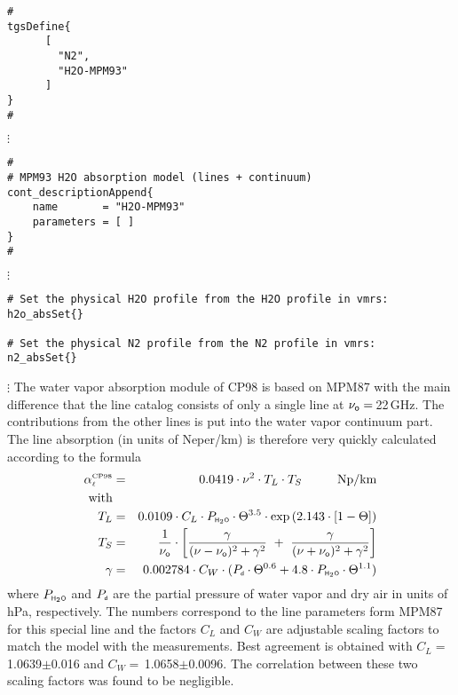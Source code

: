 {

\begin{verbatim}
#
tgsDefine{
      [ 
        "N2",
        "H2O-MPM93"
      ] 
}
#
\end{verbatim}
$\vdots$
\begin{verbatim}
#
# MPM93 H2O absorption model (lines + continuum)
cont_descriptionAppend{
    name       = "H2O-MPM93"
    parameters = [ ]
}
#
\end{verbatim}
$\vdots$
\begin{verbatim}
# Set the physical H2O profile from the H2O profile in vmrs:
h2o_absSet{}

# Set the physical N2 profile from the N2 profile in vmrs:
n2_absSet{}
\end{verbatim}
$\vdots$
%
%
%
% 
\label{leveld:cp98}
%
\label{levele:cp98_line}
The water vapor absorption module of CP98 \cite{cruzpol:98} is based on 
MPM87 with the main difference that the line catalog consists of only a 
single line at $\nu_{\sf o}=$\,22\,GHz. 
The contributions from the other lines is put into the water vapor 
continuum part. The line absorption (in units of Neper/km) is therefore 
very quickly calculated according to the formula
\begin{eqnarray}
  \label{eq:cp98:lineabs}
  \alphacpl &=& 0.0419 \cdot \nu^2 \cdot T_L \cdot T_S\hspace*{10mm}\mbox{Np/km}\\
  \mbox{with} & & \nonumber\\
  T_L       &=& 0.0109 \cdot C_L \cdot \phzo \cdot \Theta^{3.5} 
                \cdot \exp{(2.143\cdot[1-\Theta])}\nonumber\\
  T_S       &=& \frac{1}{\nu_{\sf o}} \cdot 
                \left[\frac{\gamma}{(\nu-\nu_{\sf o})^2+\gamma^2}~+~
                \frac{\gamma}{(\nu+\nu_{\sf o})^2+\gamma^2}\right]\nonumber\\
  \gamma    &=& 0.002784 \cdot C_W \cdot (\pda \cdot \Theta^{0.6}+ 
                4.8 \cdot \phzo \cdot \Theta^{1.1}) \nonumber\\
\end{eqnarray}
where $P_{\mbox{\tiny \sf H}_{2}\mbox{\tiny \sf O}}$ and $P_{\mbox{\tiny \sf d}}$ are the partial pressure of water vapor and dry
air in units of hPa, respectively. The numbers correspond to the line
parameters form MPM87 for this special line and the factors  $C_L$ and $C_W$
are adjustable scaling factors to match the model with the
measurements. Best agreement is obtained with 
$C_L=$\,1.0639$\pm$0.016 and $C_W=$\,1.0658$\pm$0.0096. The
correlation between these two scaling factors was found to be
negligible.

}
